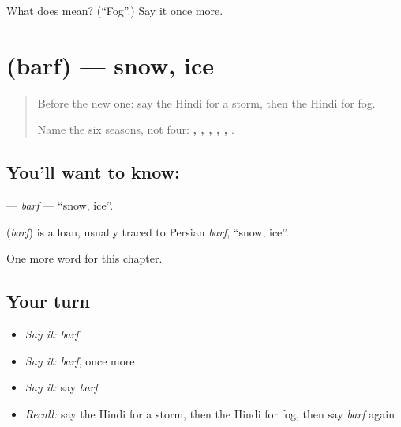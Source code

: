 \begin{tcolorbox}[breakable,colback=teal!4,colframe=teal!35!black,title={Before you move on}]
What does  mean? (\textquotedblleft{}Fog\textquotedblright{}.) Say it once more.
\end{tcolorbox}
\section[\texorpdfstring{\hi{बर्फ़} (barf)}{बर्फ़ (barf)}]{ (barf) — snow, ice}

\label{lesson:HI-C145-barf}



\begin{quote}
Before the new one: say the Hindi for a storm, then the Hindi for fog.

Name the six seasons, not four: \textbf{, , , , , }.
\end{quote}

\subsection*{You'll want to know: }
\textbf{} — \emph{barf} — \textquotedblleft{}snow, ice\textquotedblright{}.

\begin{cousinweb}
\textbf{} (\emph{barf}) is a loan, usually traced to Persian \emph{barf}, \textquotedblleft{}snow, ice\textquotedblright{}.
\end{cousinweb}

\begin{grammarlens}[title={What you've built}]
One more word for this chapter.
\end{grammarlens}

\subsection*{Your turn}
\begin{itemize}
\raggedright
  \item \emph{Say it:} \emph{barf}
  \item \emph{Say it:} \emph{barf}, once more
  \item \emph{Say it:} say \emph{barf}
  \item \emph{Recall:} say the Hindi for a storm, then the Hindi for fog, then say \emph{barf} again
\end{itemize}

